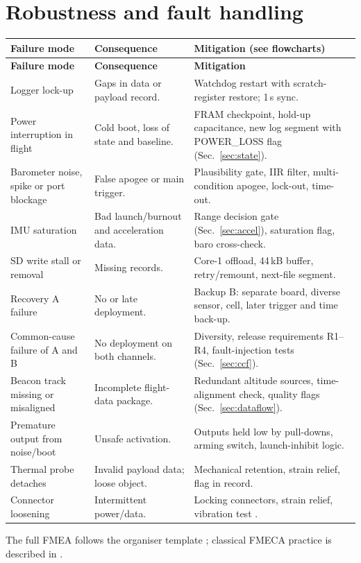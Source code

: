 \section{Robustness and fault handling}
\small
{}
\begin{longtable}{@{}L{34mm}L{50mm}L{62mm}@{}}
\toprule{}\textbf{Failure mode}&\textbf{Consequence}&\textbf{Mitigation (see flowcharts)}\\\midrule\endfirsthead
\toprule{}\textbf{Failure mode}&\textbf{Consequence}&\textbf{Mitigation}\\\midrule\endhead
\bottomrule\endlastfoot
Logger lock-up & Gaps in data or payload record. & Watchdog restart with scratch-register restore; 1\,s sync.\\
Power interruption in flight & Cold boot, loss of state and baseline. & FRAM checkpoint, hold-up capacitance, new log segment with POWER\_LOSS flag (Sec.~\ref{sec:state}).\\
Barometer noise, spike or port blockage & False apogee or main trigger. & Plausibility gate, IIR filter, multi-condition apogee, lock-out, time-out.\\
IMU saturation & Bad launch/burnout and acceleration data. & Range decision gate (Sec.~\ref{sec:accel}), saturation flag, baro cross-check.\\
SD write stall or removal & Missing records. & Core-1 offload, 44\,kB buffer, retry/remount, next-file segment.\\
Recovery A failure & No or late deployment. & Backup B: separate board, diverse sensor, cell, later trigger and time back-up.\\
Common-cause failure of A and B & No deployment on both channels. & Diversity, release requirements R1--R4, fault-injection tests (Sec.~\ref{sec:ccf}).\\
Beacon track missing or misaligned & Incomplete flight-data package. & Redundant altitude sources, time-alignment check, quality flags (Sec.~\ref{sec:dataflow}).\\
Premature output from noise/boot & Unsafe activation. & Outputs held low by pull-downs, arming switch, launch-inhibit logic.\\
Thermal probe detaches & Invalid payload data; loose object. & Mechanical retention, strain relief, flag in record.\\
Connector loosening & Intermittent power/data. & Locking connectors, strain relief, vibration test \cite{rtc2027app03}.\\
\end{longtable}
\normalsize
The full FMEA follows the organiser template \cite{rtc2027app12}; classical FMECA practice is described in \cite{mil1629a}.

